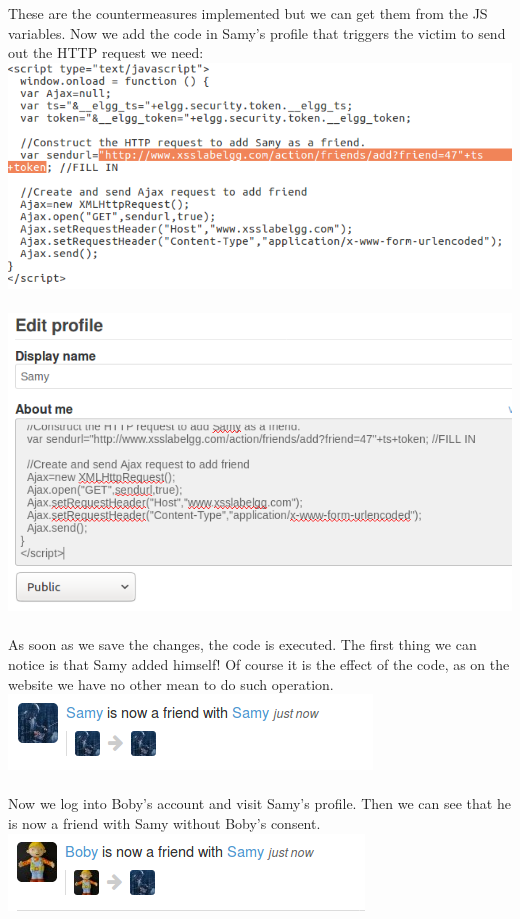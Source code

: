 \documentclass[a4paper]{article}
\begin{document}
These are the countermeasures implemented but we can get them from the JS variables. Now we add the code in Samy's profile that triggers the victim to send out the HTTP request we need:\\
\includegraphics[scale=0.7]{2/14.png}\\\\
\includegraphics[scale=0.7]{2/15.png}\\\\
As soon as we save the changes, the code is executed. The first thing we can notice is that Samy added himself! Of course it is the effect of the code, as on the website we have no other mean to do such operation.\\
\includegraphics[scale=0.7]{2/16.png}\\\\
Now we log into Boby's account and visit Samy's profile. Then we can see that he is now a friend with Samy without Boby's consent.\\
\includegraphics[scale=0.7]{2/17.png}\\\\
\pagebreak
\end{document}
